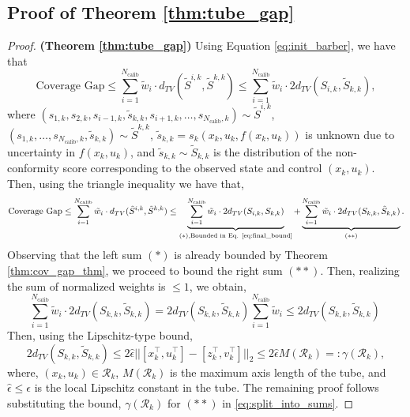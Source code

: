 \documentclass{l4dc2026}
\newcommand{\T}{^\top}
\begin{document}
\subsection{Proof of Theorem \ref{thm:tube_gap}}
\begin{proof}\textbf{(Theorem \ref{thm:tube_gap})}
    Using Equation \ref{eq:init_barber}, we have that 
    \begin{equation}\label{eq:init_barber_2}
    \text{Coverage Gap} \le \sum_{i=1}^{N_\textrm{calib}} \tilde{w}_i \cdot d_{TV}(\tilde{S}^{i,k}, \tilde{S}^{k,k}) \le \sum_{i=1}^{N_\textrm{calib}} \tilde{w}_i \cdot 2 d_{TV}(S_{i,k}, \tilde{S}_{k,k}),
    \end{equation}
    where $(s_{1,k}, s_{2,k}, s_{i-1,k}, \tilde{s}_{k,k}, s_{i+1,k}, \ldots, s_{N_\textrm{calib},k}) \sim \tilde{S}^{i,k}$, $(s_{1,k}, \ldots, s_{N_\textrm{calib},k}, \tilde{s}_{k,k}) \sim \tilde{S}^{k,k}$, $\tilde{s}_{k,k} = s_k(x_k,u_k,f(x_k,u_k))$ is unknown due to uncertainty in $f(x_k,u_k)$, and $\tilde{s}_{k,k} \sim \tilde{S}_{k,k}$ is the distribution of the non-conformity score corresponding to the observed state and control $(x_k,u_k)$. Then, using the triangle inequality we have that,
    \begin{equation}\label{eq:split_into_sums}
    \text{Coverage Gap} \le \sum_{i=1}^{N_\textrm{calib}} \tilde{w}_i \cdot d_{TV}(\tilde{S}^{i,k}, \tilde{S}^{k,k}) \le \underbrace{\sum_{i=1}^{N_\textrm{calib}} \tilde{w}_i \cdot 2 d_{TV}(S_{i,k}, S_{k,k})}_{(*), \text{Bounded in Eq. \ref{eq:final_bound}}} + \underbrace{\sum_{i=1}^{N_\textrm{calib}} \tilde{w}_i \cdot 2 d_{TV}(S_{k,k}, \tilde{S}_{k,k})}_{(**)}.
    \end{equation}
    Observing that the left sum $(*)$ is already bounded by Theorem \ref{thm:cov_gap_thm}, we proceed to bound the right sum $(**)$. Then, realizing the sum of normalized weights is $\le 1$, we obtain, 
    \begin{equation}\label{eq:near_by_cov}
        \sum_{i=1}^{N_\textrm{calib}} \tilde{w}_i \cdot 2 d_{TV}(S_{k,k}, \tilde{S}_{k,k}) = 2 d_{TV}(S_{k,k}, \tilde{S}_{k,k})\sum_{i=1}^{N_\textrm{calib}} \tilde{w}_i \le 2 d_{TV}(S_{k,k}, \tilde{S}_{k,k})\
    \end{equation}
     Then, using the Lipschitz-type bound, 
    \begin{equation}
        2 d_{TV}(S_{k,k}, \tilde{S}_{k,k}) \le 2\hat{\epsilon}||[x_k\T,u_k\T]-[z_k\T,v_k\T]||_2 \le 2\hat{\epsilon}M(\mathcal{R}_k) =: \gamma({\mathcal{R}_k}),
    \end{equation} 
    where, $(x_k,u_k) \in \mathcal{R}_k$, $M(\mathcal{R}_k)$ is the maximum axis length of the tube, and $\hat{\epsilon} \le \epsilon$ is the local Lipschitz constant in the tube. The remaining proof follows substituting the bound, $\gamma({\mathcal{R}}_k)$ for $(**)$ in \eqref{eq:split_into_sums}.
\end{proof}
\end{document}
